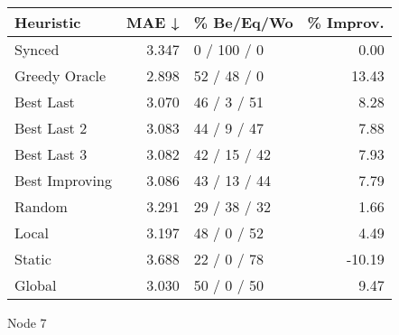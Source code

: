 \begin{tabular}{lrlr}
\toprule
\textbf{Heuristic} & \textbf{MAE ↓} & \textbf{\% Be/Eq/Wo} & \textbf{\% Improv.} \\
\midrule
            Synced &          3.347 &          0 / 100 / 0 &                0.00 \\
     Greedy Oracle &          2.898 &          52 / 48 / 0 &               13.43 \\
         Best Last &          3.070 &          46 / 3 / 51 &                8.28 \\
       Best Last 2 &          3.083 &          44 / 9 / 47 &                7.88 \\
       Best Last 3 &          3.082 &         42 / 15 / 42 &                7.93 \\
    Best Improving &          3.086 &         43 / 13 / 44 &                7.79 \\
            Random &          3.291 &         29 / 38 / 32 &                1.66 \\
             Local &          3.197 &          48 / 0 / 52 &                4.49 \\
            Static &          3.688 &          22 / 0 / 78 &              -10.19 \\
            Global &          3.030 &          50 / 0 / 50 &                9.47 \\
\bottomrule
\end{tabular}
\caption{Node 7}
\label{tab:ds_iid_lr05_le2_bs2_7}
